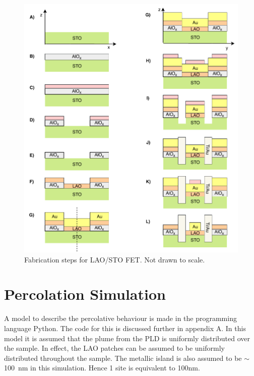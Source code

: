 \documentclass[11pt,a4paper]{report}
\begin{document}
\begin{figure}
    \centering
    \includegraphics[scale = 1]{Figures/Fabrication.pdf}
    \caption{Fabrication steps for LAO/STO FET. Not drawn to scale.}
    \label{fig:fabrication_perfet}
\end{figure}

\pagebreak

\section{Percolation Simulation}

A model to describe the percolative behaviour is made in the programming language Python. The code for this is discussed further in appendix A. In this model it is assumed that the plume from the PLD is uniformly distributed over the sample. In effect, the LAO patches can be assumed to be uniformly distributed throughout the sample. The metallic island is also assumed to be $\sim$\SI{100}{\nano\metre} in this simulation. Hence 1 site is equivalent to 100\si{nm}.
\end{document}
